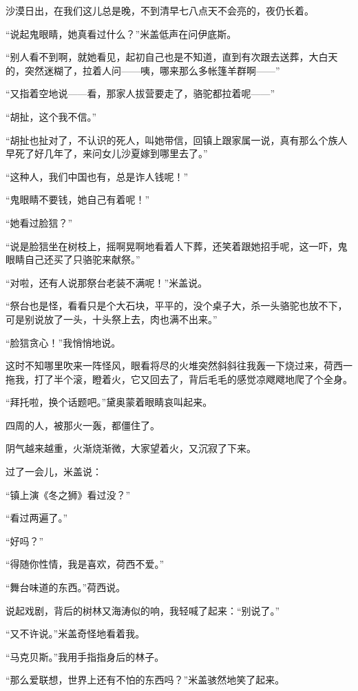 \par 沙漠日出，在我们这儿总是晚，不到清早七八点天不会亮的，夜仍长着。
\par “说起鬼眼睛，她真看过什么？”米盖低声在问伊底斯。
\par “别人看不到啊，就她看见，起初自己也是不知道，直到有次跟去送葬，大白天的，突然迷糊了，拉着人问——咦，哪来那么多帐篷羊群啊——”
\par “又指着空地说——看，那家人拔营要走了，骆驼都拉着呢——”
\par “胡扯，这个我不信。”
\par “胡扯也扯对了，不认识的死人，叫她带信，回镇上跟家属一说，真有那么个族人早死了好几年了，来问女儿沙夏嫁到哪里去了。”
\par “这种人，我们中国也有，总是诈人钱呢！”
\par “鬼眼睛不要钱，她自己有着呢！”
\par “她看过脸狺？”
\par “说是脸狺坐在树枝上，摇啊晃啊地看着人下葬，还笑着跟她招手呢，这一吓，鬼眼睛自己还买了只骆驼来献祭。”
\par “对啦，还有人说那祭台老装不满呢！”米盖说。
\par “祭台也是怪，看看只是个大石块，平平的，没个桌子大，杀一头骆驼也放不下，可是别说放了一头，十头祭上去，肉也满不出来。”
\par “脸狺贪心！”我悄悄地说。
\par 这时不知哪里吹来一阵怪风，眼看将尽的火堆突然斜斜往我轰一下烧过来，荷西一拖我，打了半个滚，瞪着火，它又回去了，背后毛毛的感觉凉飕飕地爬了个全身。
\par “拜托啦，换个话题吧。”黛奥蒙着眼睛哀叫起来。
\par 四周的人，被那火一轰，都僵住了。
\par 阴气越来越重，火渐烧渐微，大家望着火，又沉寂了下来。
\par 过了一会儿，米盖说：
\par “镇上演《冬之狮》看过没？”
\par “看过两遍了。”
\par “好吗？”
\par “得随你性情，我是喜欢，荷西不爱。”
\par “舞台味道的东西。”荷西说。
\par 说起戏剧，背后的树林又海涛似的响，我轻喊了起来：“别说了。”
\par “又不许说。”米盖奇怪地看着我。
\par “马克贝斯。”我用手指指身后的林子。
\par “那么爱联想，世界上还有不怕的东西吗？”米盖骇然地笑了起来。
